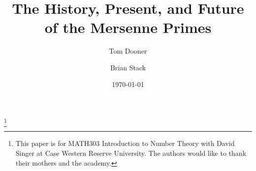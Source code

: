 \documentclass[]{amsart}
\theoremstyle{definition}
\begin{document}
\title{The History, Present, and Future of the Mersenne Primes}
\date{\today}


\thanks{This paper is for MATH303 Introduction to Number Theory with David Singer at Case Western Reserve University. The authors would like to thank their mothers and the academy.}

\author{Tom Dooner}
\address{Case Western Reserve University, 
Cleveland, OH 44106}

\author{Brian Stack}
\address{Case Western Reserve University, 
Cleveland, OH 44106}

\maketitle








\end{document}
